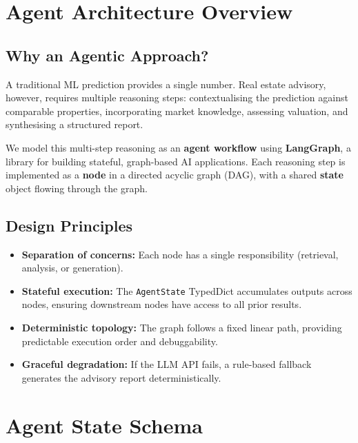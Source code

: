 \documentclass[11pt,a4paper]{article}
\begin{document}
\section{Agent Architecture Overview}

\subsection{Why an Agentic Approach?}

A traditional ML prediction provides a single number.
Real estate advisory, however, requires multiple reasoning steps: contextualising the prediction against comparable properties, incorporating market knowledge, assessing valuation, and synthesising a structured report.

We model this multi-step reasoning as an \textbf{agent workflow} using \textbf{LangGraph}, a library for building stateful, graph-based AI applications.
Each reasoning step is implemented as a \textbf{node} in a directed acyclic graph (DAG), with a shared \textbf{state} object flowing through the graph.

\subsection{Design Principles}

\begin{itemize}[leftmargin=*]
    \item \textbf{Separation of concerns:} Each node has a single responsibility (retrieval, analysis, or generation).
    \item \textbf{Stateful execution:} The \texttt{AgentState} TypedDict accumulates outputs across nodes, ensuring downstream nodes have access to all prior results.
    \item \textbf{Deterministic topology:} The graph follows a fixed linear path, providing predictable execution order and debuggability.
    \item \textbf{Graceful degradation:} If the LLM API fails, a rule-based fallback generates the advisory report deterministically.
\end{itemize}

\section{Agent State Schema}
\end{document}
